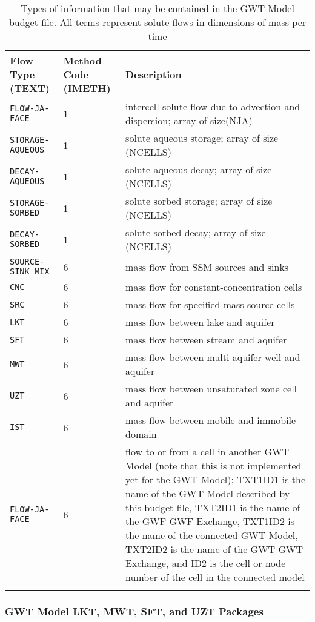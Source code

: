 \begin{longtable}{p{3.5cm} p{2cm} p{9cm}}
\caption{Types of information that may be contained in the GWT Model budget file.  All terms represent solute flows in dimensions of mass per time} 
\tabularnewline
\hline
\textbf{Flow Type (TEXT)} & \textbf{Method Code (IMETH)} & \textbf{Description} \\
\hline
\endhead
\hline
\endfoot
\texttt{FLOW-JA-FACE} & 1 & intercell solute flow due to advection and dispersion; array of size(NJA) \\
\texttt{STORAGE-AQUEOUS} & 1 & solute aqueous storage; array of size (NCELLS) \\
\texttt{DECAY-AQUEOUS} & 1 & solute aqueous decay; array of size (NCELLS) \\
\texttt{STORAGE-SORBED} & 1 & solute sorbed storage; array of size (NCELLS) \\
\texttt{DECAY-SORBED} & 1 & solute sorbed decay; array of size (NCELLS) \\
\texttt{SOURCE-SINK MIX} & 6 & mass flow from SSM sources and sinks \\
\texttt{CNC} & 6 & mass flow for constant-concentration cells \\
\texttt{SRC} & 6 & mass flow for specified mass source cells \\
\texttt{LKT} & 6 & mass flow between lake and aquifer \\
\texttt{SFT} & 6 & mass flow between stream and aquifer \\
\texttt{MWT} & 6 & mass flow between multi-aquifer well and aquifer \\
\texttt{UZT} & 6 & mass flow between unsaturated zone cell and aquifer \\
\texttt{IST} & 6 & mass flow between mobile and immobile domain \\
\texttt{FLOW-JA-FACE} & 6 & flow to or from a cell in another GWT Model (note that this is not implemented yet for the GWT Model); TXT1ID1 is the name of the GWT Model described by this budget file, TXT2ID1 is the name of the GWF-GWF Exchange, TXT1ID2 is the name of the connected GWT Model, TXT2ID2 is the name of the GWT-GWT Exchange, and ID2 is the cell or node number of the cell in the connected model \\
\label{table:gwtbud}
\end{longtable}

\subsubsection{GWT Model LKT, MWT, SFT, and UZT Packages}

